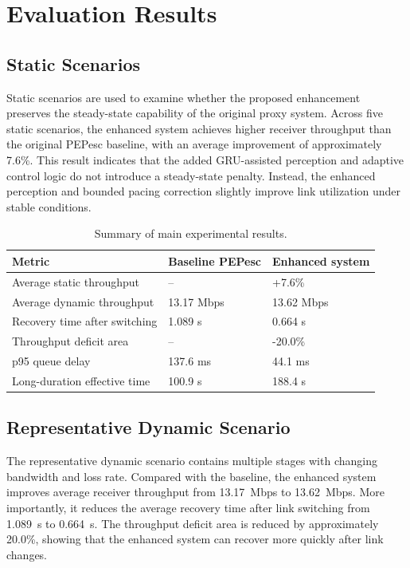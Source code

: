 \section{Evaluation Results}
\label{sec:evaluation}

\subsection{Static Scenarios}
Static scenarios are used to examine whether the proposed enhancement preserves the steady-state capability of the original proxy system. Across five static scenarios, the enhanced system achieves higher receiver throughput than the original PEPesc baseline, with an average improvement of approximately 7.6\%. This result indicates that the added GRU-assisted perception and adaptive control logic do not introduce a steady-state penalty. Instead, the enhanced perception and bounded pacing correction slightly improve link utilization under stable conditions.

\begin{table}[t]
\centering
\caption{Summary of main experimental results.}
\label{tab:main_results}
\begin{tabular}{lll}
\toprule
Metric & Baseline PEPesc & Enhanced system \\
\midrule
Average static throughput & -- & +7.6\% \\
Average dynamic throughput & 13.17 Mbps & 13.62 Mbps \\
Recovery time after switching & 1.089 s & 0.664 s \\
Throughput deficit area & -- & -20.0\% \\
p95 queue delay & 137.6 ms & 44.1 ms \\
Long-duration effective time & 100.9 s & 188.4 s \\
\bottomrule
\end{tabular}
\end{table}

\subsection{Representative Dynamic Scenario}
The representative dynamic scenario contains multiple stages with changing bandwidth and loss rate. Compared with the baseline, the enhanced system improves average receiver throughput from 13.17~Mbps to 13.62~Mbps. More importantly, it reduces the average recovery time after link switching from 1.089~s to 0.664~s. The throughput deficit area is reduced by approximately 20.0\%, showing that the enhanced system can recover more quickly after link changes.

